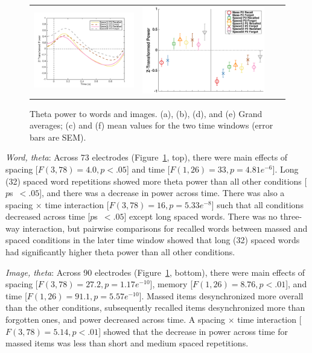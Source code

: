 \begin{figure}[H]
\begin{tabular}{cccc}
  \includegraphics[width=.30\textwidth]{./figs/exp2/tfr_line/tfr_line_ga_img_rc_spac12_p2_img_fo_spac12_p2_img_rc_spac32_p2_img_fo_spac32_p2_4_8_-100_1000_90ROIs_legend} &
  \includegraphics[width=.30\textwidth]{./figs/exp2/tfr_avg/tfr_avg_ga_img_rc_mass_p2_img_fo_mass_p2_img_rc_spac2_p2_img_fo_spac2_p2_img_rc_spac12_p2_img_fo_spac12_p2_img_rc_spac32_p2_img_fo_spac32_p2_4_8_0_500_500_1000_90ROI_ylabel} \\
  \end{tabular}
  \caption{Theta power to words and images.  (a), (b), (d), and (e) Grand averages; (c) and (f) mean values for the two time windows (error bars are SEM).}
  \label{fig:s2_word_img_theta}
\end{figure}

\textit{Word, theta}: Across 73 electrodes (Figure~\ref{fig:s2_word_img_theta}, top), there were main effects of spacing [$F(3,78)=4.0, p<.05$] and time [$F(1,26)=33, p=4.81e^{-6}$].  Long (32) spaced word repetitions showed more theta power than all other conditions [$p$s~$<.05$], and there was a decrease in power across time.  There was also a spacing $\times$ time interaction [$F(3,78)=16, p=5.33e^{-8}$] such that all conditions decreased across time [$p$s~$<.05$] except long spaced words.
There was no three-way interaction, but pairwise comparisons for recalled words between massed and spaced conditions in the later time window showed that long (32) spaced words had significantly higher theta power than all other conditions.

\textit{Image, theta}: Across 90 electrodes (Figure~\ref{fig:s2_word_img_theta}, bottom), there were main effects of spacing [$F(3,78)=27.2, p=1.17e^{-10}$], memory [$F(1,26)=8.76, p<.01$], and time [$F(1,26)=91.1, p=5.57e^{-10}$].  Massed items desynchronized more overall than the other conditions, subsequently recalled items desynchronized more than forgotten ones, and power decreased across time.  A spacing $\times$ time interaction [$F(3,78)=5.14, p<.01$] showed that the decrease in power across time for massed items was less than short and medium spaced repetitions.

